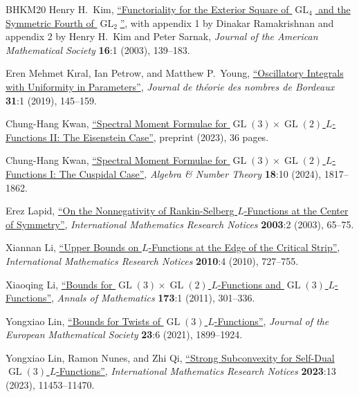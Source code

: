 \documentclass[11pt,a4paper]{amsart}
\DeclareMathOperator{\GL}{GL}
\numberwithin{equation}{section}
\theoremstyle{remark}
\theoremstyle{definition}
\begin{document}
\begin{thebibliography}{BHKM20}
 Henry H.~Kim, \href{https://doi.org/10.1090/S0894-0347-02-00410-1}{``Functoriality for the Exterior Square of $\GL_4$ and the Symmetric Fourth of $\GL_2$''}, with appendix 1 by Dinakar Ramakrishnan and appendix 2 by Henry H.~Kim and Peter Sarnak, \textit{Journal of the American Mathematical Society} \textbf{16}:1 (2003), 139--183.

 Eren Mehmet K\i{}ral, Ian Petrow, and Matthew P.~Young, \href{https://doi.org/10.5802/jtnb.1072}{``Oscillatory Integrals with Uniformity in Parameters''}, \textit{Journal de th\'{e}orie des nombres de Bordeaux} \textbf{31}:1 (2019), 145--159.

 Chung-Hang Kwan, \href{https://arxiv.org/abs/2310.09419v2}{``Spectral Moment Formulae for $\GL(3) \times \GL(2)$ $L$-Functions II: The Eisenstein Case''}, preprint (2023), 36 pages.

 Chung-Hang Kwan, \href{https://doi.org/10.2140/ant.2024.18.1817}{``Spectral Moment Formulae for $\GL(3) \times \GL(2)$ $L$-Functions I: The Cuspidal Case''}, \textit{Algebra \&{} Number Theory} \textbf{18}:10 (2024), 1817--1862.

 Erez Lapid, \href{https://doi.org/10.1155/S1073792803204013}{``On the Nonnegativity of Rankin-Selberg $L$-Functions at the Center of Symmetry''}, \textit{International Mathematics Research Notices} \textbf{2003}:2 (2003), 65--75.

 Xiannan Li, \href{https://doi.org/10.1093/imrn/rnp148}{``Upper Bounds on $L$-Functions at the Edge of the Critical Strip''}, \textit{International Mathematics Research Notices} \textbf{2010}:4 (2010), 727--755.

 Xiaoqing Li, \href{https://doi.org/10.4007/annals.2011.173.1.8}{``Bounds for $\GL(3) \times \GL(2)$ $L$-Functions and $\GL(3)$ $L$-Functions''}, \textit{Annals of Mathematics} \textbf{173}:1 (2011), 301--336.

 Yongxiao Lin, \href{https://doi.org/10.4171/jems/1046}{``Bounds for Twists of $\GL(3)$ $L$-Functions''}, \textit{Journal of the European Mathematical Society} \textbf{23}:6 (2021), 1899--1924.

 Yongxiao Lin, Ramon Nunes, and Zhi Qi, \href{https://doi.org/10.1093/imrn/rnac153}{``Strong Subconvexity for Self-Dual $\GL(3)$ $L$-Functions''}, \textit{International Mathematics Research Notices} \textbf{2023}:13 (2023), 11453--11470.


\end{thebibliography}
\end{document}
